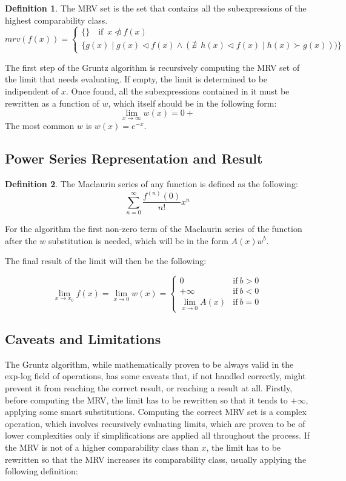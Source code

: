 \documentclass{article}
\theoremstyle{plain}
\theoremstyle{definition}
\newtheorem*{defn*}{Definition}
\theoremstyle{algorithm}
\begin{document}
	\begin{defn*}
		The MRV set is the set that contains all the subexpressions of the highest comparability class.
		\[
		mrv(f(x)) = \begin{cases}
			\{\} \quad \text{if} \enspace x \ntriangleleft f(x) \\
			\{g(x) \mid g(x) \triangleleft f(x) \wedge (\nexists \enspace h(x) \triangleleft f(x) \mid h(x) \succ g(x)))\}
		\end{cases}
		\]
	\end{defn*} \label{defn:mrv}
	
	The first step of the Gruntz algorithm is recursively computing the MRV set of the limit that needs evaluating. If empty, the limit is determined to be indipendent of \(x\). 
	Once found, all the subexpressions contained in it must be rewritten as a function of \(w\), which itself should be in the following form: 
	\[
	\lim_{x \to \infty}{w(x)} = 0+
	\]
	The most common \(w\) is \(w(x) = e^{-x}\).
	
	\subsection{Power Series Representation and Result}
	
	\begin{defn*}
		The Maclaurin series of any function is defined as the following:
		\[
		\sum_{n=0}^{\infty}{\frac{f^{(n)}(0)}{n!} x^{n}} \tag{3} \label{eq:maclaurin}
		\] 
	\end{defn*}
	
	For the algorithm the first non-zero term of the Maclaurin series of the function after the \(w\) substitution is needed, which will be in the form \(A(x)w^b\).
	
	The final result of the limit will then be the following:
	
	\[
	\lim_{x \to x_{0}}{f(x)} = \lim_{x \to 0}{w(x)} = \begin{cases}
		0 &\text{if} \: b > 0 \\
		+\infty &\text{if} \: b < 0\\
		\lim_{x \to 0}{A(x)} &\text{if} \: b = 0
	\end{cases} \tag{4} \label{eq:result}
	\]
	
	\subsection{Caveats and Limitations}
	
	The Gruntz algorithm, while mathematically proven to be always valid in the exp-log field of operations, has some caveats that, if not handled correctly, might prevent it from reaching the correct result, or reaching a result at all. Firstly, before computing the MRV, the limit has to be rewritten so that it tends to \(+\infty\), applying some smart substitutions.
	Computing the correct MRV set is a complex operation, which involves recursively evaluating limits, which are proven to be of lower complexities only if simplifications are applied all throughout the process. If the MRV is not of a higher comparability class than \({x}\), the limit has to be rewritten so that the MRV increases its comparability class, usually applying the following definition:
	
\end{document}

